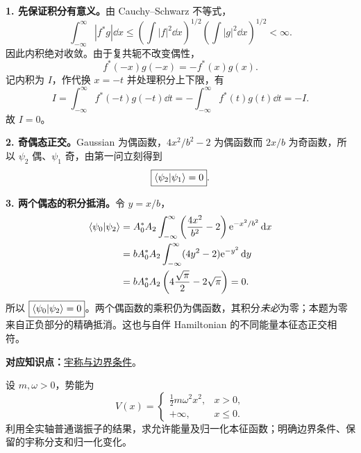 \begin{checkedsolution}
\textbf{1. 先保证积分有意义。}由 Cauchy--Schwarz 不等式，
\begin{equation}
  \int_{-\infty}^{\infty}|f^*g|\dd x
  \le\left(\int|f|^2\dd x\right)^{1/2}
      \left(\int|g|^2\dd x\right)^{1/2}<\infty.
\end{equation}
因此内积绝对收敛。由于复共轭不改变偶性，
\begin{equation}
  f^*(-x)g(-x)=-f^*(x)g(x).
\end{equation}
记内积为 $I$，作代换 $x=-t$ 并处理积分上下限，有
\begin{equation}
  I=\int_{-\infty}^{\infty}f^*(-t)g(-t)\dd t
    =-\int_{-\infty}^{\infty}f^*(t)g(t)\dd t=-I.
\end{equation}
故 $\boxed{I=0}$。

\textbf{2. 奇偶态正交。}Gaussian 为偶函数，$4x^2/b^2-2$ 为偶函数而 $2x/b$ 为奇函数，所以 $\psi_2$ 偶、$\psi_1$ 奇，由第一问立刻得到
\begin{equation}
  \boxed{\left\langle \psi_2 \middle| \psi_1 \right\rangle=0}.
\end{equation}

\textbf{3. 两个偶态的积分抵消。}令 $y=x/b$，
\begin{align}
  \left\langle \psi_0 \middle| \psi_2 \right\rangle
  &=A_0^*A_2\int_{-\infty}^{\infty}
       \left(\frac{4x^2}{b^2}-2\right)\mathrm{e}^{-x^2/b^2}\mathop{}\!\mathrm{d} x\\
  &=bA_0^*A_2\int_{-\infty}^{\infty}(4y^2-2)\mathrm{e}^{-y^2}\mathop{}\!\mathrm{d} y\\
  &=bA_0^*A_2\left(4\frac{\sqrt\pi}{2}-2\sqrt\pi\right)=0.
\end{align}
所以 $\boxed{\left\langle \psi_0 \middle| \psi_2 \right\rangle=0}$。两个偶函数的乘积仍为偶函数，其积分\emph{未必}为零；本题为零来自正负部分的精确抵消。这也与自伴 Hamiltonian 的不同能量本征态正交相符。
\end{checkedsolution}

\textbf{对应知识点：}\hyperref[topic:QM-C07-S03-T05]{宇称与边界条件}。

设 $m,\omega>0$，势能为
\begin{equation}
  V(x)=\begin{cases}
    \frac12m\omega^2x^2,&x>0,\\
    +\infty,&x\le0.
  \end{cases}
\end{equation}
利用全实轴普通谐振子的结果，求允许能量及归一化本征函数；明确边界条件、保留的宇称分支和归一化变化。

